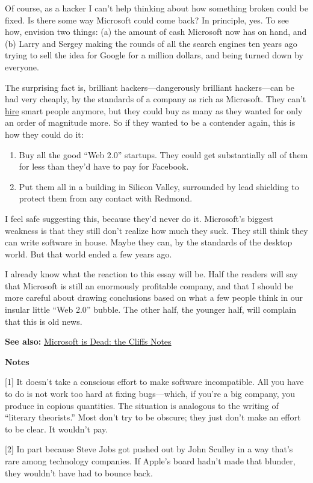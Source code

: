 Of course, as a hacker I can't help thinking about how something broken
could be fixed. Is there some way Microsoft could come back? In
principle, yes. To see how, envision two things: (a) the amount of cash
Microsoft now has on hand, and (b) Larry and Sergey making the rounds of
all the search engines ten years ago trying to sell the idea for Google
for a million dollars, and being turned down by everyone.

The surprising fact is, brilliant hackers---dangerously brilliant
hackers---can be had very cheaply, by the standards of a company as rich
as Microsoft. They can't \href{hiring.html}{hire} smart people anymore,
but they could buy as many as they wanted for only an order of magnitude
more. So if they wanted to be a contender again, this is how they could
do it:

\begin{enumerate}
\def\labelenumi{\arabic{enumi}.}
\item
  Buy all the good ``Web 2.0'' startups. They could get substantially
  all of them for less than they'd have to pay for Facebook.
\item
  Put them all in a building in Silicon Valley, surrounded by lead
  shielding to protect them from any contact with Redmond.
\end{enumerate}

I feel safe suggesting this, because they'd never do it. Microsoft's
biggest weakness is that they still don't realize how much they suck.
They still think they can write software in house. Maybe they can, by
the standards of the desktop world. But that world ended a few years
ago.

I already know what the reaction to this essay will be. Half the readers
will say that Microsoft is still an enormously profitable company, and
that I should be more careful about drawing conclusions based on what a
few people think in our insular little ``Web 2.0'' bubble. The other
half, the younger half, will complain that this is old news.

\textbf{See also:} \href{cliffsnotes.html}{Microsoft is Dead: the Cliffs
Notes}

\textbf{Notes}

{[}1{]} It doesn't take a conscious effort to make software
incompatible. All you have to do is not work too hard at fixing
bugs---which, if you're a big company, you produce in copious
quantities. The situation is analogous to the writing of ``literary
theorists.'' Most don't try to be obscure; they just don't make an
effort to be clear. It wouldn't pay.

{[}2{]} In part because Steve Jobs got pushed out by John Sculley in a
way that's rare among technology companies. If Apple's board hadn't made
that blunder, they wouldn't have had to bounce back.
